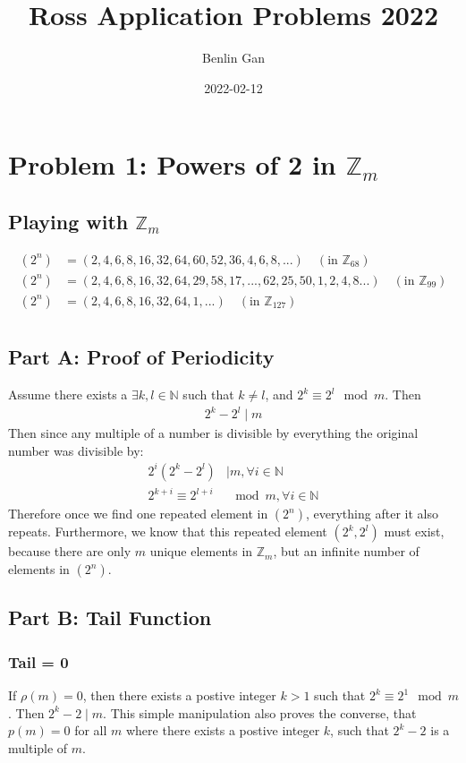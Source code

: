 \documentclass{article}
\title{Ross Application Problems 2022}
\date{2022-02-12}
\author{Benlin Gan}
\begin{document}
  \maketitle
  \newpage
  \section{Problem 1: Powers of 2 in $\mathbb{Z}_m$}
  \subsection{Playing with $\mathbb{Z}_m$}
  \begin{align*}
    (2^n) &= (2, 4, 6, 8, 16, 32, 64, 60, 52, 36, 4, 6, 8, ...)   \hspace{1em}  (\textrm{in } \mathbb{Z}_{68})\\ 
    (2^n) &= (2, 4, 6, 8, 16, 32, 64, 29, 58, 17, ..., 62, 25, 50, 1, 2, 4, 8 ...) \hspace{1em}     (\textrm{in } \mathbb{Z}_{99})\\
    (2^n) &= (2, 4, 6, 8, 16, 32, 64, 1, ...) \hspace{1em}     (\textrm{in } \mathbb{Z}_{127})\\
  \end{align*}
  \subsection{Part A: Proof of Periodicity}
  Assume there exists a $\exists k, l \in \mathbb{N}$ such that $k \neq l$, and $2^k \equiv 2^l \mod m$. Then
  \begin{align}
    2^k - 2^l \mid m
  \end{align}
  Then since any multiple of a number is divisible by everything the original number was divisible by:
  \begin{align}
    2^i(2^k - 2^l) &\mid m, \forall i \in \mathbb{N}\\
    2^{k+i} \equiv 2^{l+i} &\mod m, \forall i \in \mathbb{N}
  \end{align}
  Therefore once we find one repeated element in $(2^n)$, everything after it also repeats. Furthermore, we know that this repeated element $(2^k, 2^l)$ must exist, because there are only $m$ unique elements in $\mathbb{Z}_m$, but an infinite number of elements in $(2^n)$.
  \subsection{Part B: Tail Function}
  \subsubsection{Tail = 0}
  If $\rho (m) = 0$, then there exists a postive integer $k > 1$ such that $2^k \equiv 2^1 \mod m$. Then $2^k - 2 \mid m$. This simple manipulation also proves the converse, that $p(m) = 0$ for all $m$ where there exists a postive integer $k$, such that $2^k - 2$ is a multiple of $m$.\\
\end{document}
